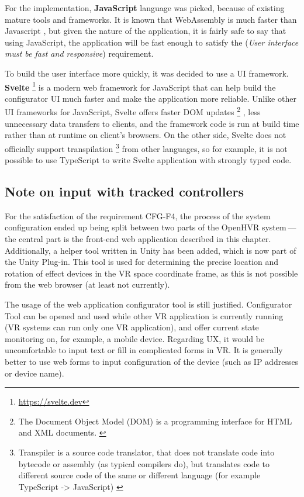 For the implementation, \textbf{JavaScript} language was picked, because
of existing mature tools and frameworks. It is known that WebAssembly
is much faster than Javascript \cite{wasmfast}, but given the nature of the
application, it is fairly safe to say that using JavaScript, the application
will be fast enough to satisfy the \hyperlink{./05-analysis}{}
(\emph{User interface must be fast and responsive})
requirement.


To build the user interface more quickly, it was decided to use a UI framework.
\textbf{Svelte} \footnote{\href{https://svelte.dev}{https://svelte.dev}} is a modern web framework for JavaScript
that can help build the configurator UI much faster and make the application
more reliable. Unlike other UI frameworks for JavaScript, Svelte offers
faster DOM updates
\footnote{The Document Object Model (DOM) is a programming interface for HTML and XML documents. \cite{dom}}
, less unnecessary data transfers
to clients, and the framework code is run at build time rather than at runtime on
client’s browsers. \cite{svelteblog} On the other side, Svelte does not officially
support transpilation
\footnote{Transpiler is a source code translator, that does not translate code into bytecode or assembly (as typical compilers do), but translates code to different source code of the same or different language (for example TypeScript -> JavaScript) \cite{sscd}}
from other languages, so for example, it is not possible
to use TypeScript to write Svelte application with strongly typed code.


\hypertarget{x-note-on-input-with-tracked-controllers}{\subsection{Note on input with tracked controllers}}
For the satisfaction of the requirement CFG-F4, the process of the system configuration
ended up being split between two parts of the OpenHVR system — the central part is the front-end web application described
in this chapter. Additionally, a helper tool written in Unity has been added,
which is now part of the Unity Plug-in. This tool is used for determining
the precise location and rotation of effect devices in the VR space
coordinate frame, as this is not possible from the web browser (at least
not currently).


The usage of the web application configurator tool is still justified.
Configurator Tool can be opened and used while other VR application is currently
running (VR systems can run only one VR application), and offer current state
monitoring on, for example, a mobile device. Regarding UX, it would be uncomfortable to
input text or fill in complicated forms in VR. It is generally better to use web forms to
input configuration of the device (such as IP addresses or device name).


